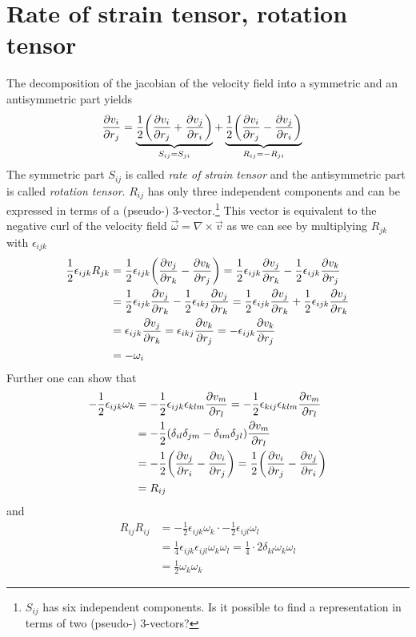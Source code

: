 \section{Rate of strain tensor, rotation tensor}\label{rotstraintensor}
The decomposition of the jacobian of the velocity field into a symmetric and
an antisymmetric part yields
\begin{align}
\ppd{r_j}{v_i}&=
\underbrace{\frac{1}{2}\lra{\ppd{r_j}{v_i}+\ppd{r_i}{v_j}}}_{S_{ij}=S_{ji}}
+\underbrace{\frac{1}{2}\lra{\ppd{r_j}{v_i}-\ppd{r_i}{v_j}}}_{R_{ij}=-R_{ji}}
\end{align}
The symmetric part $S_{ij}$ is called \emph{rate of strain tensor} and the
antisymmetric part is called \emph{rotation tensor}. $R_{ij}$ has only three
independent components and can be expressed in terms of a (pseudo-)
3-vector.\footnote{$S_{ij}$ has six independent components. Is it possible to
find a representation in terms of two (pseudo-) 3-vectors?}
This vector is equivalent to the negative curl of the velocity field 
$\vec{\omega}=\nabla \times \vec{v}$ as we can see by multiplying $R_{jk}$ with
$\epsilon_{ijk}$
\begin{align*}
\frac{1}{2}\epsilon_{ijk}R_{jk}&=\frac{1}{2}\epsilon_{ijk}\lra{\ppd{r_k}{v_j}
-\ppd { r_j } { v_k}}=
\frac{1}{2}\epsilon_{ijk}\ppd{r_k}{v_j}-\frac{1}{2}\epsilon_{ijk}\ppd{r_j}{v_k}
\\
&=
\frac{1}{2}\epsilon_{ijk}\ppd{r_k}{v_j}-\frac{1}{2}\epsilon_{ikj}\ppd{r_k}{v_j}
=
\frac{1}{2}\epsilon_{ijk}\ppd{r_k}{v_j}+\frac{1}{2}\epsilon_{ijk}\ppd{r_k}{v_j}
\\
&=
\epsilon_{ijk}\ppd{r_k}{v_j}
=\epsilon_{ikj}\ppd{r_j}{v_k}
=-\epsilon_{ijk}\ppd{r_j}{v_k}\\
&=-\omega_i
\end{align*}
Further one can show that
\begin{align*}
-\frac{1}{2}\epsilon_{ijk}\omega_k
&=-\frac{1}{2}\epsilon_{ijk}\epsilon_{klm}\ppd{r_l}{v_m}
=-\frac{1}{2}\epsilon_{kij}\epsilon_{klm}\ppd{r_l}{v_m}\\
&=-\frac{1}{2}\lra{\delta_{il}\delta_{jm}-\delta_{im}\delta_{jl}}\ppd{r_l}{v_m}
\\
&=-\frac{1}{2}\lra{\ppd{r_i}{v_j}-\ppd{r_j}{v_i}}
=\frac{1}{2}\lra{\ppd{r_j}{v_i}-\ppd{r_i}{v_j}}\\
&=R_{ij}
\end{align*}
and
\begin{align}
R_{ij} R_{ij} 
&=-\frac{1}{2}\epsilon_{ijk}\omega_k \cdot -\frac{1}{2}\epsilon_{ijl}\omega_l\\
&=\frac{1}{4}\epsilon_{ijk}\epsilon_{ijl}\omega_k \omega_l
=\frac{1}{4} \cdot 2 \delta_{kl} \omega_k \omega_l\\
&=\frac{1}{2} \omega_k \omega_k
\label{eq:rrcontr}
\end{align}
